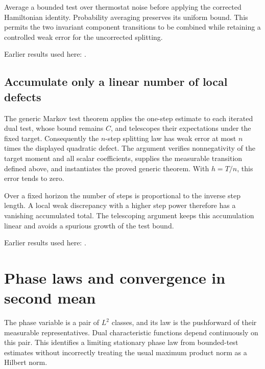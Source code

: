 \documentclass[11pt,a4paper]{report}
\begin{document}
Average a bounded test over thermostat noise before applying the corrected Hamiltonian identity. Probability averaging preserves its uniform bound. This permits the two invariant component transitions to be combined while retaining a controlled weak error for the uncorrected splitting.



Earlier results used here: \cite[Section~3.33.5]{LangevinLean2026ULASC}.
\subsection{\texorpdfstring{Accumulate only a linear number of local defects}{Accumulate only a linear number of local defects}}
\label{report-step-KineticLangevin-SplittingTarget-lean-6}


The generic Markov test theorem applies the one-step estimate to each iterated dual test, whose bound remains \(C\), and telescopes their expectations under the fixed target. Consequently the \(n\)-step splitting law has weak error at most \(n\) times the displayed quadratic defect. The argument verifies nonnegativity of the target moment and all scalar coefficients, supplies the measurable transition defined above, and instantiates the proved generic theorem. With \(h=T/n\), this error tends to zero.



Over a fixed horizon the number of steps is proportional to the inverse step length. A local weak discrepancy with a higher step power therefore has a vanishing accumulated total. The telescoping argument keeps this accumulation linear and avoids a spurious growth of the test bound.



Earlier results used here: \cite[Section~3.33.6]{LangevinLean2026ULASC}.
\section{\texorpdfstring{Phase laws and convergence in second mean}{Phase laws and convergence in second mean}}
\label{proof-module-KineticLangevin-LpPhaseLaw-lean}


The phase variable is a pair of \(L^{2}\) classes, and its law is the pushforward of their measurable representatives. Dual characteristic functions depend continuously on this pair. This identifies a limiting stationary phase law from bounded-test estimates without incorrectly treating the usual maximum product norm as a Hilbert norm.
\end{document}
